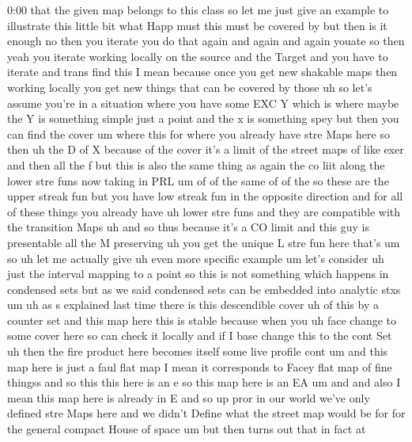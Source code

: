 \begin{unfinished}{0:00}
that  the  given  map  belongs  to  this
class  so  let  me  just  give  an  example  to
illustrate  this  little  bit  what
Happ  must  this  must  be  covered  by  but
then  is  it  enough  no  then  you  iterate
you  do  that  again  and  again  and  again
youate  so  then  yeah  you  iterate  working
locally  on  the  source  and  the  Target  and
you  have  to  iterate  and  trans  find
this  I  mean  because  once  you  get  new
shakable  maps  then  working  locally  you
get  new  things  that  can  be  covered  by
those  uh  so  let's  assume  you're  in  a
situation  where  you  have  some  EXC  Y
which  is  where  maybe  the  Y  is  something
simple  just  a  point  and  the  x  is
something  spey  but  then  you  can  find  the
cover  um  where  this  for  where  you
already  have  stre  Maps  here  so  then  uh
the  D  of
X  because  of  the  cover  it's  a  limit  of
the  street  maps  of
like  exer  and  then  all  the
f
but  this  is  also  the  same  thing  as  again
the  co  liit  along  the  lower  stre  funs
now  taking  in
PRL
um
of  of  the  same  of  of
the  so  these  are  the  upper  streak  fun
but  you  have  low  streak  fun  in  the
opposite
direction  and  for  all  of  these  things
you  already  have  uh  lower  stre
funs  and  they  are  compatible  with  the
transition  Maps  uh  and  so  thus  because
it's  a  CO  limit  and  this  guy  is
presentable  all  the  M  preserving  uh  you
get  the  unique  L  stre  fun
here
that's
um
so  uh  let  me  actually  give  uh  even  more
specific  example
um  let's  consider
uh  just  the  interval  mapping  to  a  point
so  this  is  not  something  which  happens
in  condensed  sets  but  as  we  said
condensed  sets  can  be  embedded  into
analytic  stxs
um  uh  as  s  explained  last  time  there  is
this  descendible  cover  uh  of  this  by  a
counter
set  and  this  map  here  this  is  stable
because  when  you
uh  face  change  to  some  cover  here  so  can
check  it  locally  and  if  I  base  change
this  to  the  cont
Set
uh  then  the  fire  product  here  becomes
itself  some  live
profile  cont
um  and  this  map  here  is  just  a  faul  flat
map  I  mean  it  corresponds  to  Facey  flat
map  of  fine  thingss  and  so  this  this
here  is  an  e  so  this  map  here  is  an
EA  um  and  and  also  I  mean  this  map  here
is  already  in
E  and  so  up  pror  in  our  world  we've  only
defined  stre  Maps  here  and  we  didn't
Define  what  the  street  map  would  be  for
for  the  general  compact  House  of  space
um  but  then  turns  out  that  in  fact  at

\end{unfinished}
